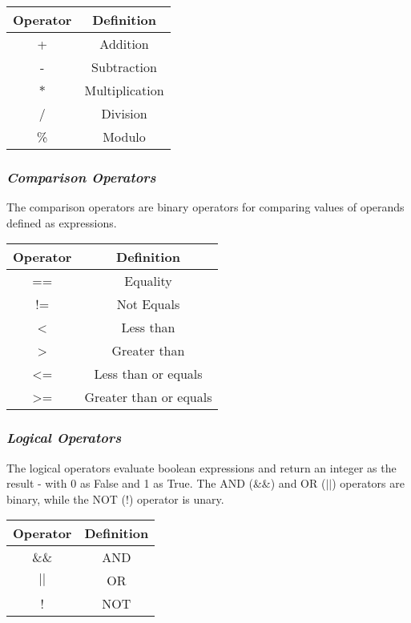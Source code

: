 \documentclass[letterpaper,12pt]{article}
\begin{document}
            \begin{center}
                \begin{tabular}{ |c|c| }
                \hline
                    \textbf{Operator} & \textbf{Definition} \\
                    \hline
                    +   &   Addition\\
                    -   &   Subtraction\\
                    $*$   &   Multiplication\\
                    /   &   Division\\
                    \%  &   Modulo\\
                \hline
                \end{tabular}
            \end{center}

        \subsubsection{\textit{Comparison Operators}}
        The comparison operators are binary operators for comparing values of operands defined as expressions.
            \begin{center}
                \begin{tabular}{ |c|c| }
                \hline
                    \textbf{Operator} & \textbf{Definition} \\
                    \hline
                    ==  			& Equality \\
                    !=  			& Not Equals \\
                    \textless		& Less than \\
                    \textgreater	& Greater than \\
                    \textless=		& Less than or equals \\
                    \textgreater=	& Greater than or equals \\
                \hline
                \end{tabular}
            \end{center}
        
        \subsubsection{\textit{Logical Operators}}
        The logical operators evaluate boolean expressions and return an integer as the result - with 0 as False and 1 as True. The AND (\&\&) and OR ($||$) operators are binary, while the NOT (!) operator is unary.
	        \begin{center}
	        	\begin{tabular}{ |c|c| }
	        		\hline
	        		\textbf{Operator} & \textbf{Definition} \\
	        		\hline
	        		\&\&  & AND \\
	        		$||$  & OR \\
	        		!  & NOT \\
	        		\hline
	        	\end{tabular}
	        \end{center}
\end{document}
